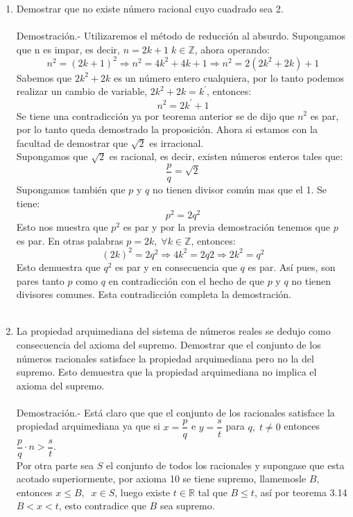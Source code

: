 \begin{enumerate}
\item Demostrar que no existe número racional cuyo cuadrado sea 2.\\\\
Demostración.- \; Utilizaremos el método de reducción al absurdo. Supongamos que n es impar, es decir, $n=2k+1\; k \in \mathbb{Z}$, ahora operando:
$$n^2=(2k+1)^2 \Rightarrow  n^2 = 4k^2 +4k + 1 \Rightarrow n^2=2(2k^2+2k)+1$$
Sabemos que $2k^2+2k$ es un número entero cualquiera, por lo tanto podemos realizar un cambio de variable, $2k^2+2k = k^{'}$, entonces:
$$n^2=2k^{'} +1$$
Se tiene una contradicción ya por teorema anterior se de dijo que $n^2$ es par, por lo tanto queda demostrado la proposición.  
Ahora si estamos con la facultad de demostrar que  $\sqrt{2}$ es irracional.\\
Supongamos que $\sqrt{2}$ es racional, es decir, existen números enteros tales que:
$$\displaystyle\frac{p}{q}=\sqrt{2}$$
Supongamos también que $p$ y $q$ no tienen divisor común mas que el 1. Se tiene:
$$p^2=2q^2$$
Esto nos muestra que $p^2$ es par y  por la previa demostración tenemos que $p$ es par. En otras palabras $p = 2k, \; \forall k \in \mathbb{Z}$, entonces:
$$(2k)^2 = 2q^2 \Rightarrow 4k^2 = 2q2 \Rightarrow 2k^2 = q^2 $$
Esto demuestra que $q^2$ es par y en consecuencia que $q$ es par. Así pues, son pares tanto $p$ como $q$ en contradicción con el hecho de que $p$ y $q$ no tienen divisores comunes. Esta contradicción completa la demostración.\\\\

\item La propiedad arquimediana del sistema de números reales se dedujo como consecuencia del axioma del supremo. Demostrar que el conjunto de los números racionales satisface la propiedad arquimediana pero no la del supremo. Esto demuestra que la propiedad arquimediana no implica el axioma del supremo.\\\\
Demostración.- \; Está claro que que el conjunto de los racionales satisface la propiedad arquimediana ya que si $x=\dfrac{p}{q}$ e $y=\dfrac{s}{t}$ para $q,\; t \neq 0$ entonces $\dfrac{p}{q}\cdot n>\dfrac{s}{t}$.\\
Por otra parte sea $S$ el conjunto de todos los racionales y supongase que esta acotado superiormente, por axioma 10 se tiene supremo, llamemosle $B$, entonces $x\leq B, \; \; x \in S$, luego existe $t\in \mathbb{R}$ tal que $B\leq t$, así por teorema 3.14 \; $B<x<t$,  esto contradice que $B$ sea supremo.\\\\ 


\end{enumerate}

